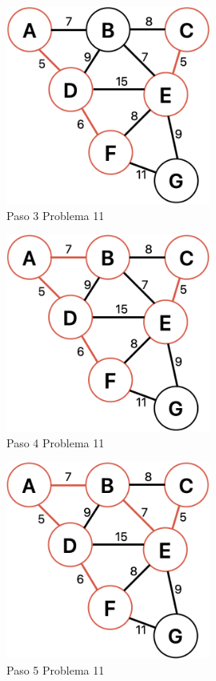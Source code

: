 \documentclass[12pt]{article}  %
\begin{document}
\begin{figure}[H]
\centering
\caption{Paso 3 Problema 11}
\label{fig:paso3Prob11}
\includegraphics[width=0.6\textwidth]{paso3Prob11.png}
\end{figure}

\begin{figure}[H]
\centering
\caption{Paso 4 Problema 11}
\label{fig:paso4Prob11}
\includegraphics[width=0.6\textwidth]{paso4Prob11.png}
\end{figure}

\begin{figure}[H]
\centering
\caption{Paso 5 Problema 11}
\label{fig:paso5Prob11}
\includegraphics[width=0.6\textwidth]{paso5Prob11.png}
\end{figure}
\end{document}
